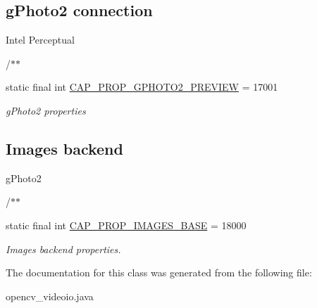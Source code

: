 \subsection*{g\+Photo2 connection}
\label{_amgrp190de4ba27ec870ae1edac91cdcae582}%
 Intel Perceptual 

/$\ast$$\ast$ \begin{DoxyCompactItemize}
\item 
static final int \hyperlink{group__videoio__flags__others_ga2d0e0d7cb640eb1dc635b6351fc64c42}{C\+A\+P\+\_\+\+P\+R\+O\+P\+\_\+\+G\+P\+H\+O\+T\+O2\+\_\+\+P\+R\+E\+V\+I\+EW} = 17001
\begin{DoxyCompactList}\small\item\em g\+Photo2 properties \end{DoxyCompactList}\end{DoxyCompactItemize}
\subsection*{Images backend}
\label{_amgrpf4bcbe1ab751845a9b3aa892849e1b20}%
 g\+Photo2 

/$\ast$$\ast$ \begin{DoxyCompactItemize}
\item 
static final int \hyperlink{group__videoio__flags__others_ga6a4667b5803848ad28674572fabd3557}{C\+A\+P\+\_\+\+P\+R\+O\+P\+\_\+\+I\+M\+A\+G\+E\+S\+\_\+\+B\+A\+SE} = 18000
\begin{DoxyCompactList}\small\item\em Images backend properties. \end{DoxyCompactList}\end{DoxyCompactItemize}


The documentation for this class was generated from the following file\+:\begin{DoxyCompactItemize}
\item 
opencv\+\_\+videoio.\+java\end{DoxyCompactItemize}
